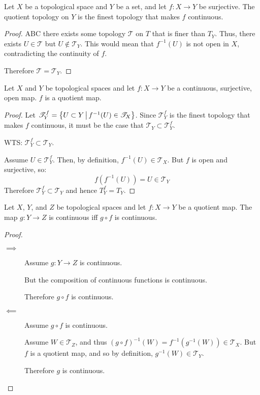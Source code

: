 \documentclass[letterpaper,12pt,fleqn]{article}
\newcommand{\T}{\mathscr{T}}
\begin{document}
\begin{theorem}[7.48]
  Let \(X\) be a topological space and \(Y\) be a set, and let \(f:X\to Y\) be surjective.  The quotient topology on
  \(Y\) is the finest topology that makes \(f\) continuous.
\end{theorem}

\begin{proof}
  ABC there exists some topology \(\T\) on \(T\) that is finer than \(T_Y\).  Thus, there exists \(U\in\T\) but
  \(U\notin\T_Y\).  This would mean that \(f^{-1}(U)\) is not open in \(X\), contradicting the continuity of \(f\).

  Therefore \(\T=\T_Y\).
\end{proof}

\begin{theorem}[7.49]
  Let \(X\) and \(Y\) be topological spaces and let \(f:X\to Y\) be a continuous, surjective, open map.  \(f\) is
  a quotient map.
\end{theorem}

\begin{proof}
  Let \(\T_Y^f=\setb{U\subset Y}{f^{-1}(U)\in\T_X}\).  Since \(\T_Y^f\) is the finest topology that makes \(f\)
  continuous, it must be the case that \(\T_Y\subset\T_Y^f\).

  WTS: \(\T_Y^f\subset\T_Y\).

  Assume \(U\in\T_Y^f\).  Then, by definition, \(f^{-1}(U)\in\T_X\).  But \(f\) is open and surjective, so:
  \[f(f^{-1}(U))=U\in\T_Y\]
  Therefore \(\T_Y^f\subset\T_Y\) and hence \(T_Y^f=T_Y\).
\end{proof}

\begin{theorem}[7.53]
  Let \(X\), \(Y\), and \(Z\) be topological spaces and let \(f:X\to Y\) be a quotient map.  The map \(g:Y\to Z\)
  is continuous iff \(g\circ f\) is continuous.
\end{theorem}

\begin{proof}
  \begin{description}
  \item[]
  \item[\(\implies\)] Assume \(g:Y\to Z\) is continuous.

    But the composition of continuous functions is continuous.

    Therefore \(g\circ f\) is continuous.

  \item[\(\impliedby\)] Assume \(g\circ f\) is continuous.

    Assume \(W\in\T_Z\), and thus \((g\circ f)^{-1}(W)=f^{-1}(g^{-1}(W))\in\T_X\).  But \(f\) is a quotient map, and
    so by definition, \(g^{-1}(W)\in\T_Y\).

    Therefore \(g\) is continuous.
  \end{description}
\end{proof}
\end{document}
